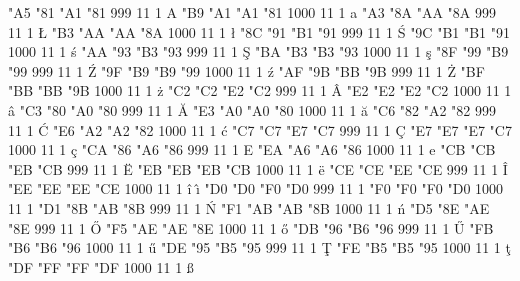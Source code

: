 \setcharcode  "A5  "81  "A1  "81   999  11  1  \texaccent \og A
\setcharcode  "B9  "A1  "A1  "81  1000  11  1  \texaccent \og a
\setcharcode  "A3  "8A  "AA  "8A   999  11  1  \texmacro  \L
\setcharcode  "B3  "AA  "AA  "8A  1000  11  1  \texmacro  \l
\setcharcode  "8C  "91  "B1  "91   999  11  1  \texaccent \'S
\setcharcode  "9C  "B1  "B1  "91  1000  11  1  \texaccent \'s
\setcharcode  "AA  "93  "B3  "93   999  11  1  \texaccent \c S
\setcharcode  "BA  "B3  "B3  "93  1000  11  1  \texaccent \c s
\setcharcode  "8F  "99  "B9  "99   999  11  1  \texaccent \'Z
\setcharcode  "9F  "B9  "B9  "99  1000  11  1  \texaccent \'z
\setcharcode  "AF  "9B  "BB  "9B   999  11  1  \texaccent \.Z
\setcharcode  "BF  "BB  "BB  "9B  1000  11  1  \texaccent \.z
\setcharcode  "C2  "C2  "E2  "C2   999  11  1  \texaccent \^A
\setcharcode  "E2  "E2  "E2  "C2  1000  11  1  \texaccent \^a
\setcharcode  "C3  "80  "A0  "80   999  11  1  \texaccent \u A
\setcharcode  "E3  "A0  "A0  "80  1000  11  1  \texaccent \u a
\setcharcode  "C6  "82  "A2  "82   999  11  1  \texaccent \'C
\setcharcode  "E6  "A2  "A2  "82  1000  11  1  \texaccent \'c
\setcharcode  "C7  "C7  "E7  "C7   999  11  1  \texaccent \c C
\setcharcode  "E7  "E7  "E7  "C7  1000  11  1  \texaccent \c c
\setcharcode  "CA  "86  "A6  "86   999  11  1  \texaccent \og E
\setcharcode  "EA  "A6  "A6  "86  1000  11  1  \texaccent \og e
\setcharcode  "CB  "CB  "EB  "CB   999  11  1  \texaccent \"E
\setcharcode  "EB  "EB  "EB  "CB  1000  11  1  \texaccent \"e
\setcharcode  "CE  "CE  "EE  "CE   999  11  1  \texaccent \^I
\setcharcode  "EE  "EE  "EE  "CE  1000  11  1  \texaccent \^i  \texaccent \^\i
\setcharcode  "D0  "D0  "F0  "D0   999  11  1  \texmacro \Dslash
\setcharcode  "F0  "F0  "F0  "D0  1000  11  1  \texmacro \dslash
\setcharcode  "D1  "8B  "AB  "8B   999  11  1  \texaccent \'N
\setcharcode  "F1  "AB  "AB  "8B  1000  11  1  \texaccent \'n
\setcharcode  "D5  "8E  "AE  "8E   999  11  1  \texaccent \H O
\setcharcode  "F5  "AE  "AE  "8E  1000  11  1  \texaccent \H o
\setcharcode  "DB  "96  "B6  "96   999  11  1  \texaccent \H U
\setcharcode  "FB  "B6  "B6  "96  1000  11  1  \texaccent \H u
\setcharcode  "DE  "95  "B5  "95   999  11  1  \texaccent \c T
\setcharcode  "FE  "B5  "B5  "95  1000  11  1  \texaccent \c t
\setcharcode  "DF  "FF  "FF  "DF  1000  11  1  \texmacro  \ss


